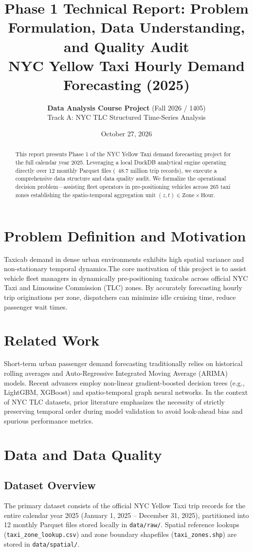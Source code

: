 \documentclass[11pt,a4paper]{article}
\title{\textbf{\Large Phase 1 Technical Report: Problem Formulation, Data Understanding, and Quality Audit}\\
\large NYC Yellow Taxi Hourly Demand Forecasting (2025)}
\author{\textbf{Data Analysis Course Project} (Fall 2026 / 1405)\\
Track A: NYC TLC Structured Time-Series Analysis}
\date{October 27, 2026}
\begin{document}
\maketitle

\begin{abstract}
This report presents Phase 1 of the NYC Yellow Taxi demand forecasting project for the full calendar year 2025. Leveraging a local DuckDB analytical engine operating directly over 12 monthly Parquet files (~48.7 million trip records), we execute a comprehensive data structure and data quality audit. We formalize the operational decision problem—assisting fleet operators in pre-positioning vehicles across 265 taxi zones establishing the spatio-temporal aggregation unit $(z, t) \in \text{Zone} \times \text{Hour}$.
\end{abstract}

\section{Problem Definition and Motivation}
Taxicab demand in dense urban environments exhibits high spatial variance and non-stationary temporal dynamics.The core motivation of this project is to assist vehicle fleet managers in dynamically pre-positioning taxicabs across official NYC Taxi and Limousine Commission (TLC) zones. By accurately forecasting hourly trip originations per zone, dispatchers can minimize idle cruising time, reduce passenger wait times.

\section{Related Work}
Short-term urban passenger demand forecasting traditionally relies on historical rolling averages and Auto-Regressive Integrated Moving Average (ARIMA) models. Recent advances employ non-linear gradient-boosted decision trees (e.g., LightGBM, XGBoost) and spatio-temporal graph neural networks. In the context of NYC TLC datasets, prior literature emphasizes the necessity of strictly preserving temporal order during model validation to avoid look-ahead bias and spurious performance metrics.

\section{Data and Data Quality}

\subsection{Dataset Overview}
The primary dataset consists of the official NYC Yellow Taxi trip records for the entire calendar year 2025 (January 1, 2025 -- December 31, 2025), partitioned into 12 monthly Parquet files stored locally in \texttt{data/raw/}. Spatial reference lookups (\texttt{taxi\_zone\_lookup.csv}) and zone boundary shapefiles (\texttt{taxi\_zones.shp}) are stored in \texttt{data/spatial/}.
\end{document}
